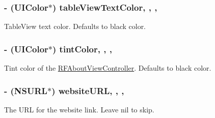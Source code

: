 \subsubsection[{table\+View\+Text\+Color}]{\setlength{\rightskip}{0pt plus 5cm}-\/ (U\+I\+Color$\ast$) table\+View\+Text\+Color\hspace{0.3cm}{\ttfamily [read]}, {\ttfamily [write]}, {\ttfamily [nonatomic]}, {\ttfamily [strong]}}\label{interface_r_f_about_view_controller_a4a3eebb1c1bcdbf534cba553490f5693}
Table\+View text color. Defaults to black color. \hypertarget{interface_r_f_about_view_controller_afe63a728705f3cbc1e80ed7a88d261d6}{}
\subsubsection[{tint\+Color}]{\setlength{\rightskip}{0pt plus 5cm}-\/ (U\+I\+Color$\ast$) tint\+Color\hspace{0.3cm}{\ttfamily [read]}, {\ttfamily [write]}, {\ttfamily [nonatomic]}, {\ttfamily [strong]}}\label{interface_r_f_about_view_controller_afe63a728705f3cbc1e80ed7a88d261d6}
Tint color of the \hyperlink{interface_r_f_about_view_controller}{R\+F\+About\+View\+Controller}. Defaults to black color. \hypertarget{interface_r_f_about_view_controller_ada5abbb17506142724670fc442d76d23}{}
\subsubsection[{website\+U\+R\+L}]{\setlength{\rightskip}{0pt plus 5cm}-\/ (N\+S\+U\+R\+L$\ast$) website\+U\+R\+L\hspace{0.3cm}{\ttfamily [read]}, {\ttfamily [write]}, {\ttfamily [nonatomic]}, {\ttfamily [strong]}}\label{interface_r_f_about_view_controller_ada5abbb17506142724670fc442d76d23}
The U\+R\+L for the website link. Leave nil to skip. \hypertarget{interface_r_f_about_view_controller_a09a97ea3299148bec27c9c2b550b8939}{}
